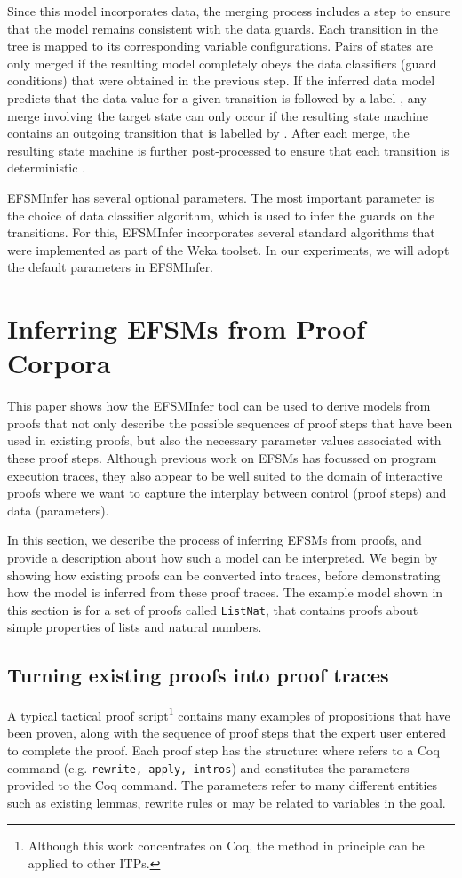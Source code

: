 \documentclass{llncs}
\begin{document}
Since this model incorporates data, the merging process includes a step to ensure that the model remains consistent with the data guards. Each transition in the tree is mapped to its corresponding variable configurations. Pairs of states are only merged if the resulting model completely obeys the data classifiers (guard conditions) that were obtained in the previous step. If the inferred data model predicts that the data value for a given transition is followed by a label , any merge involving the target state can only occur if the resulting state machine contains an outgoing transition that is labelled by . After each merge, the resulting state machine is further post-processed to ensure that each transition is deterministic \cite{Walkinshaw13}. 

EFSMInfer has several optional parameters. The most important parameter is the choice of data classifier algorithm, which is used to infer the guards on the transitions. For this, EFSMInfer incorporates several standard algorithms that were implemented as part of the Weka \cite{Weka09} toolset. In our experiments, we will adopt the default parameters in EFSMInfer.

\section{Inferring EFSMs from Proof Corpora}
\label{sec:efsm}
This paper shows how the EFSMInfer tool can be used to derive models from proofs that not only describe the possible sequences of proof steps that have been used in existing proofs, but also the necessary parameter values associated with these proof steps. Although previous work on EFSMs has focussed on program execution traces, they also appear to be well suited to the domain of interactive proofs where we want to capture the interplay between control (proof steps) and data (parameters).

In this section, we describe the process of inferring EFSMs from proofs, and provide a description about how such a model can be interpreted. We begin by showing how existing proofs can be converted into traces, before demonstrating how the model is inferred from these proof traces. The example model shown in this section is for a set of proofs called \texttt{ListNat}, that contains proofs about simple properties of lists and natural numbers.

\subsection{Turning existing proofs into proof traces}
A typical tactical proof script\footnote{Although this work concentrates on Coq, the method in principle can be applied to other ITPs.} contains many examples of propositions that have been proven, along with the sequence of proof steps that the expert user entered to complete the proof. Each proof step has the structure:  where  refers to a Coq command (e.g. \texttt{rewrite, apply, intros}) and  constitutes the parameters provided to the Coq command. The parameters refer to many different entities such as existing lemmas, rewrite rules or may be related to variables in the goal. 
\end{document}
